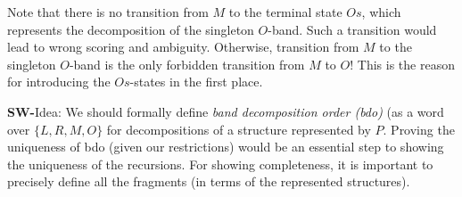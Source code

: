 \documentclass[11pt]{article} %
\newcommand{\SW}[1]{\textbf{SW-}#1}
\newcommand{\PKnone}{P\!K}
\newcommand{\constrIO} {_\text{O}}
\newcommand{\constrIL} {_\text{L}}
\newcommand{\constrIIO}{_\text{O}}
\newcommand{\constrIIR}{_\text{R}}
\begin{document}
\begin{center}
\end{center}

Note that there is no transition from $M$ to the terminal state $Os$, which represents the decomposition of the singleton $O$-band. Such a transition would lead to wrong scoring and ambiguity. Otherwise, transition from $M$ to the singleton $O$-band is the only forbidden transition from $M$ to $O$! This is the reason for introducing the $Os$-states in the first place.  

\SW{Idea: We should formally define \emph{band decomposition order (bdo)} (as a word over $\{L,R,M,O\}$ for decompositions of a structure
represented by $P$. Proving the uniqueness of bdo (given our restrictions) would be an essential step to showing the uniqueness of the recursions. For showing completeness, it is important to precisely define all the fragments (in terms of the represented structures).}
\end{document}
